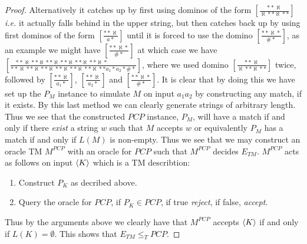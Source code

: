 \documentclass[a4paper,11pt]{article}
\newcommand{\ie}{\emph{i.e.} }
\numberwithin{equation}{section}
\begin{document}
\begin{proof}
Alternatively it catches up by first using dominos of the form $ \left[\frac{\ast\ast\aleph}{\aleph\ast\ast\aleph\ast\ast}\right] $ \ie it actually falls behind in the upper string, but then catches back up by using first dominos of the form $ \left[\frac{\ast\ast\aleph}{a\ast}\right] $ until it is forced to use the domino $ \left[\frac{\ast\ast\aleph\ast}{\#\ast}\right] $, as an example we might have $ \left[\frac{\ast\ast\aleph\ast}{\#\ast}\right]  $ at which case we have $ \left[\frac{\ast\ast\aleph\ast\ast\aleph\ast\ast\aleph\ast\ast\aleph\ast\ast\aleph\ast\ast\aleph\ast\quad\quad \qquad }{\ast\ast\aleph\ast\ast\aleph\ast\ast\aleph\ast\ast\aleph\ast\ast\aleph\ast\ast\aleph\ast\ast a_1\ast a_2\ast\#\ast}\right] $, where we used domino $ \left[\frac{\ast\ast\aleph}{\aleph\ast\ast\aleph\ast\ast}\right] $ twice, followed by $ \left[\frac{\ast\ast\aleph}{a_1\ast}\right] $, $ \left[\frac{\ast\ast\aleph}{a_2\ast}\right] $ and $ \left[\frac{\ast\ast\aleph\ast}{\#\ast}\right] $. It is clear that by doing this we have set up the $ P_M $ instance to simulate $ M $ on input $ a_1a_2 $ by constructing any match, if it exists. By this last method we can clearly generate strings of arbitrary length. Thus we see that the constructed $ PCP $ instance, $ P_M $, will have a match if and  only if there \emph{exist} a string $ w $ such that $ M $ accepts $ w $ or equivalently $ P_M $ has a match if and only if $ L(M) $ is non-empty.  
Thus we see that we may construct an oracle TM $ M^{PCP} $ with an oracle for $ PCP $ such that $ M^{PCP} $ decides $ E_{TM} $. $ M^{PCP} $ acts as follows on input $ \braket{K} $ which is a TM describtion:\begin{enumerate}
	\item Construct $ P_K $ as decribed above.
	\item Query the oracle for $ PCP $, if $ P_K\in PCP $, if true \emph{reject}, if false, \emph{accept}.
\end{enumerate}
Thus by the arguments above we clearly have that $ M^{PCP} $ accepts $ \braket{K} $ if and only if $ L(K)=\emptyset $. This shows that $ E_{TM}\leq_T PCP $.
\end{proof}
\end{document}
